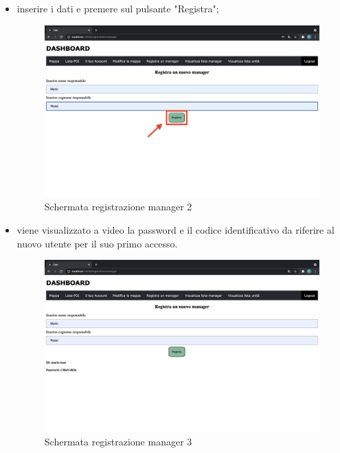 \begin{itemize}
    \item inserire i dati e premere sul pulsante "Registra";
    \begin{figure}[H]
        \centering
        \includegraphics[scale=0.12]{res/images/newmanager_2.png}
        \caption{Schermata registrazione manager 2}
    \end{figure}
    \item viene visualizzato a video la password e il codice identificativo da riferire al nuovo utente per il suo primo accesso.
    \begin{figure}[H]
        \centering
        \includegraphics[scale=0.12]{res/images/newmanager3.png}
        \caption{Schermata registrazione manager 3}
    \end{figure}
\end{itemize}




